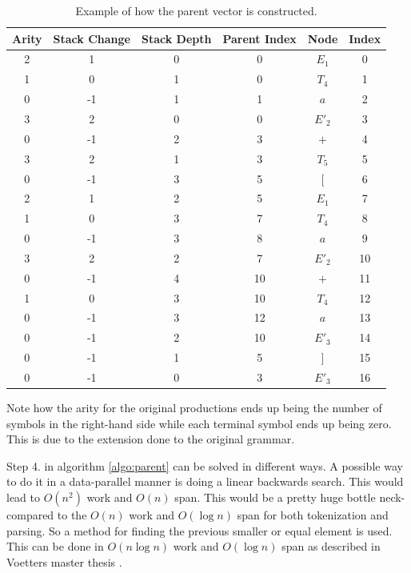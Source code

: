 \documentclass[a4paper,12pt]{article}
\theoremstyle{definition}
\begin{document}
\begin{table}[H]
  \centering
  \begin{tabular}{c|c|c|c|c|c}
    Arity & Stack Change & Stack Depth & Parent Index & Node & Index \\ \hline
    2 & 1  & 0 & 0  & $E_1$  & 0  \\ \hline
    1 & 0  & 1 & 0  & $T_4$  & 1  \\ \hline
    0 & -1 & 1 & 1  & $a$    & 2  \\ \hline
    3 & 2  & 0 & 0  & $E'_2$ & 3  \\ \hline
    0 & -1 & 2 & 3  & $+$    & 4  \\ \hline
    3 & 2  & 1 & 3  & $T_5$  & 5  \\ \hline
    0 & -1 & 3 & 5  & $[$    & 6  \\ \hline
    2 & 1  & 2 & 5  & $E_1$  & 7  \\ \hline
    1 & 0  & 3 & 7  & $T_4$  & 8  \\ \hline
    0 & -1 & 3 & 8  & $a$    & 9  \\ \hline
    3 & 2  & 2 & 7  & $E'_2$ & 10 \\ \hline
    0 & -1 & 4 & 10 & $+$    & 11 \\ \hline
    1 & 0  & 3 & 10 & $T_4$  & 12 \\ \hline
    0 & -1 & 3 & 12 & $a$    & 13 \\ \hline
    0 & -1 & 2 & 10 & $E'_3$ & 14 \\ \hline
    0 & -1 & 1 & 5  & $]$    & 15 \\ \hline
    0 & -1 & 0 & 3  & $E'_3$ & 16
  \end{tabular}
  \caption{Example of how the parent vector is constructed.}
\end{table}
\noindent Note how the arity for the original productions ends up being the number of symbols in the right-hand side while each terminal symbol ends up being zero. This is due to the extension done to the original grammar.

Step 4. in algorithm \ref{algo:parent} can be solved in different ways. A possible way to do it in a data-parallel manner is doing a linear backwards search. This would lead to $O(n^2)$ work and $O(n)$ span. This would be a pretty huge bottle neck-compared to the $O(n)$ work and $O(\log n)$ span for both tokenization and parsing. So a method for finding the previous smaller or equal element is used. This can be done in $O(n \log n)$ work and $O(\log n)$ span as described in Voetters master thesis \cite[32-33]{voetter2021}.
\end{document}
